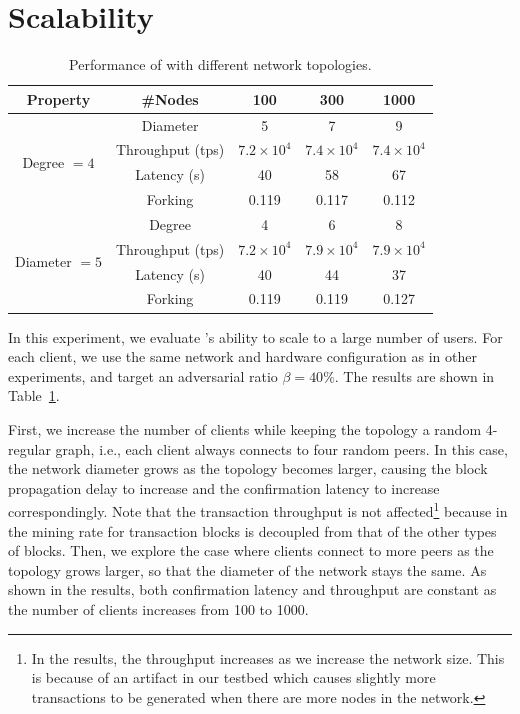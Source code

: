 
\section{Scalability}

\label{sec:eval-scale}
\begin{table}[ht]
	\centering
	\caption{\small Performance of \prism with different network topologies.}
	\begin{tabular}{| c || c | c c c |} 
	 \hline
	 Property & \#Nodes & 100 & 300 & 1000 \\ [0.5ex] 
	 \hline\hline
	 \multirow{4}{*}{Degree $=4$}   & Diameter & 5 & 7 & 9 \\
	                                & Throughput (tps) & $7.2\times 10^4$ & $7.4\times 10^4$ & $7.4\times 10^4$ \\
	                                & Latency (s) & 40 & 58 & 67 \\
	                                & Forking & 0.119 & 0.117 & 0.112 \\
	 \hline
	 \multirow{4}{*}{Diameter $=5$} & Degree & 4 & 6 & 8 \\
	                                & Throughput (tps) & $7.2\times 10^4$ & $7.9\times 10^4$ & $7.9\times 10^4$ \\ 
	                                & Latency (s) &40 & 44 & 37 \\
	                                & Forking & 0.119 & 0.119 & 0.127 \\
	 \hline
	\end{tabular}
	\label{table:scale}
	\end{table}

In this experiment, we evaluate \prism's ability to scale to a large number of users. For each client, we use the same network and hardware configuration as in other experiments, and target an adversarial ratio $\beta=40\%$. The results are shown in Table~\ref{table:scale}.

First, we increase the number of clients while keeping the topology a random 4-regular graph, i.e., each client always connects to four random peers. In this case, the network diameter grows as the topology becomes larger, causing the block propagation delay to increase and the confirmation latency to increase correspondingly. Note that the transaction throughput is not affected\footnote{In the results, the throughput increases as we increase the network size. This is because of an artifact in our testbed which causes slightly more transactions to be generated when there are more nodes in the network.} because in \prism the mining rate for transaction blocks is decoupled from that of the other types of blocks. Then, we explore the case where clients connect to more peers as the topology grows larger, so that the diameter of the network stays the same. As shown in the results, both confirmation latency and throughput are constant as the number of clients increases from 100 to 1000. 

